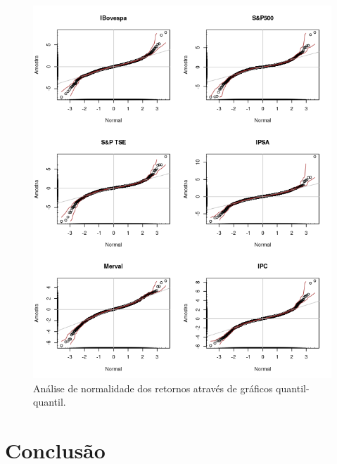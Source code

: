 \documentclass[review]{elsarticle}
\theoremstyle{definition}
\begin{document}
\begin{figure}[hp]
	\centering
	\includegraphics[width=0.9\linewidth]{artigo-qqplots}
	\caption{Análise de normalidade dos retornos através de gráficos quantil-quantil.}
	\label{fig:artigo-qqplots}
\end{figure}

\section{Conclusão}
\end{document}
